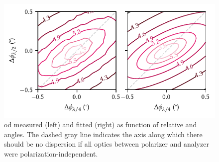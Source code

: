 \begin{figure}
    \centering
    \includegraphics{img/pdf/setup/rejection}
    \caption[]{
        \Gls{od} measured (left) and fitted (right) as function of relative \quarterwave and \halfwave angles.
        The dashed gray line indicates the axis along which there should be no dispersion if all optics between polarizer and analyzer were polarization-independent.
    }
    \label{fig:setup:optics:rejection}
\end{figure}

